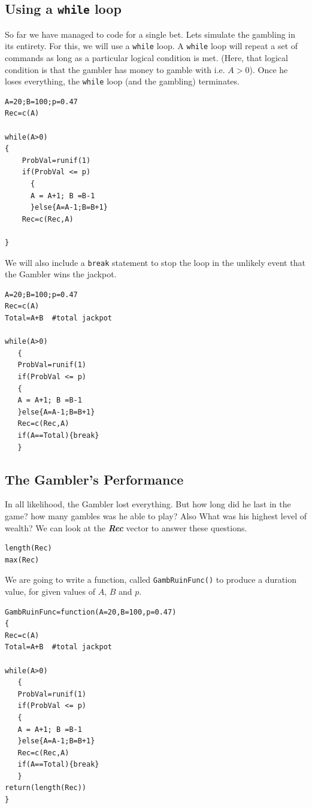 \documentclass[11pt]{article} %
\begin{document}
\subsection{Using a \texttt{while} loop}
So far we have managed to code for a single bet. Lets simulate the gambling in its entirety.
For this, we will use a \texttt{while} loop. A \texttt{while} loop will repeat a set of commands as long as a particular logical condition is met. (Here, that logical condition is that the gambler has money to gamble with i.e. $A >0$). Once he loses everything, the \texttt{while} loop (and the gambling) terminates.
\begin{framed}
\begin{verbatim}
A=20;B=100;p=0.47
Rec=c(A)

while(A>0)
{
    ProbVal=runif(1)
    if(ProbVal <= p)
      {
      A = A+1; B =B-1
      }else{A=A-1;B=B+1}
    Rec=c(Rec,A)

}
\end{verbatim}
\end{framed}
We will also include a \texttt{break} statement to stop the loop in the unlikely event that the Gambler wins the jackpot.
\begin{framed}
\begin{verbatim}
A=20;B=100;p=0.47
Rec=c(A)
Total=A+B  #total jackpot

while(A>0)
   { 
   ProbVal=runif(1)
   if(ProbVal <= p)
   {
   A = A+1; B =B-1
   }else{A=A-1;B=B+1}
   Rec=c(Rec,A)
   if(A==Total){break}
   }
\end{verbatim}
\end{framed}
\newpage
\subsection{The Gambler's Performance}
In all likelihood, the Gambler lost everything. But how long did he last in the game? how many gambles was he able to play? Also What was his highest level of wealth?
We can look at the \textbf{\textit{Rec}} vector to answer these questions.
\begin{framed}
\begin{verbatim}
length(Rec)
max(Rec)
\end{verbatim}
\end{framed}
We are going to write a function, called \texttt{GambRuinFunc()} to produce a duration value, for given values of $A$, $B$ and $p$. 
\begin{framed}
\begin{verbatim}
GambRuinFunc=function(A=20,B=100,p=0.47)
{
Rec=c(A)
Total=A+B  #total jackpot

while(A>0)
   { 
   ProbVal=runif(1)
   if(ProbVal <= p)
   {
   A = A+1; B =B-1
   }else{A=A-1;B=B+1}
   Rec=c(Rec,A)
   if(A==Total){break}
   }
return(length(Rec))
}
\end{verbatim}
\end{framed}
\end{document}
